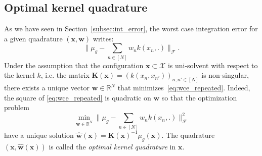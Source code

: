 \documentclass[twoside,11pt]{book}
\begin{document}
\subsection{Optimal kernel quadrature}
\label{subsec:okq_analysis_paradigm}

As we have seen in Section~\ref{subsec:int_error}, the worst case integration error for a given quadrature $(\bm{x}, \bm{w})$ writes:
\begin{equation}\label{eq:wce_repeated}
\bigg \|\mu_{g} - \sum\limits_{n \in [N]} w_{n}k(x_{n},.) \bigg\|_{\mathcal{F}}.
\end{equation}
Under the assumption that the configuration  $\bm{x} \subset \mathcal{X}$ is uni-solvent with respect to the kernel $k$, i.e. the matrix $\bm{K}(\bm{x}) = (k(x_{n},x_{n'}))_{n,n' \in [N]}$ is non-singular, there exists a unique vector $\bm{w} \in \mathbb{R}^{N}$ that minimizes~\eqref{eq:wce_repeated}. Indeed, the square of \eqref{eq:wce_repeated} is quadratic on $\bm{w}$ so that the optimization problem
\begin{equation}\label{eq:wce_repeated_optimization}
\min\limits_{\bm{w} \in \mathbb{R}^{N}} \bigg \|\mu_{g} - \sum\limits_{n \in [N]} w_{n}k(x_{n},.) \bigg\|_{\mathcal{F}}^{2}
\end{equation}
have a unique solution $\hat{\bm{w}}(\bm{x}) = \bm{K}(\bm{x})^{-1}\mu_{g}(\bm{x})$. The quadrature $(\bm{x},\hat{\bm{w}}(\bm{x}))$ is called the \emph{optimal kernel quadrature} in $\bm{x}$. 
\end{document}
